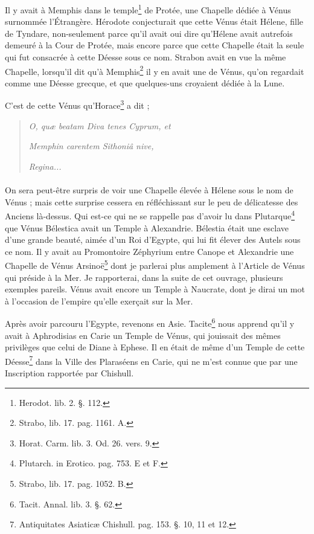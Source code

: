 \documentclass[a4paper, 18pt, oneside]{article}
\begin{document}
Il y avait à Memphis dans le temple\footnote{Herodot. lib. 2. §. 112.} de Protée, une Chapelle dédiée à Vénus surnommée l'Étrangère. Hérodote conjecturait que cette Vénus était Hélene, fille de Tyndare, non-seulement parce qu'il avait oui dire qu'Hélene avait autrefois demeuré à la Cour de Protée, mais encore parce que cette Chapelle était la seule qui fut consacrée à cette Déesse sous ce nom. Strabon avait en vue la même Chapelle, lorsqu'il dit qu'à Memphis\footnote{Strabo, lib. 17. pag. 1161. A.} il y en avait une de Vénus, qu'on regardait comme une Déesse grecque, et que quelques-uns croyaient dédiée à la Lune.

C'est de cette Vénus qu'Horace\footnote{Horat. Carm. lib. 3. Od. 26. vers. 9.} a dit ;
\begin{quotation}
\emph{O, quæ beatam Diva tenes Cyprum, et}

\emph{Memphin carentem Sithoniâ nive,}

\hspace*{15mm}\emph{Regina...}
\end{quotation}
\paragraph{}
On sera peut-être surpris de voir une Chapelle élevée à Hélene sous le nom de Vénus ; mais cette surprise cessera en réfléchissant sur le peu de délicatesse des Anciens là-dessus. Qui est-ce qui ne se rappelle pas d'avoir lu dans Plutarque\footnote{Plutarch. in Erotico. pag. 753. E et F.} que Vénus Bélestica avait un Temple à Alexandrie. Bélestia était une esclave d'une grande beauté, aimée d'un Roi d'Egypte, qui lui fit élever des Autels sous ce nom. Il y avait au Promontoire Zéphyrium entre Canope et Alexandrie une Chapelle de Vénus Arsinoë\footnote{Strabo, lib. 17. pag. 1052. B.} dont je parlerai plus amplement à l'Article de Vénus qui préside à la Mer. Je rapporterai, dans la suite de cet ouvrage, plusieurs exemples pareils. Vénus avait encore un Temple à Naucrate, dont je dirai un mot à l'occasion de l'empire qu'elle exerçait sur la Mer.

Après avoir parcouru l'Egypte, revenons en Asie. Tacite\footnote{Tacit. Annal. lib. 3. §. 62.} nous apprend qu'il y avait à Aphrodisias en Carie un Temple de Vénus, qui jouissait des mêmes privilèges que celui de Diane à Ephese. Il en était de même d'un Temple de cette Déesse\footnote{Antiquitates Asiaticæ Chishull. pag. 153. §. 10, 11 et 12.} dans la Ville des Plaraséens en Carie, qui ne m'est connue que par une Inscription rapportée par Chishull.
\end{document}
